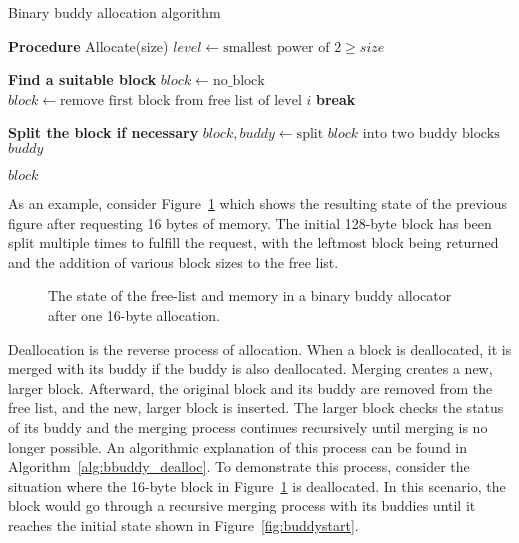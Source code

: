 \begin{algorithm}[h]
    \caption{Binary buddy allocation algorithm}
    \label{alg:bbuddy_alloc}
    \begin{algorithmic}[1]
        \Statex \textbf{Procedure} Allocate(size)
        \State $level \gets \text{smallest power of 2} \geq size$

        \Statex \textbf{Find a suitable block}
        \State $block \gets \text{no\_block}$
        \State $block \gets \text{remove first block from free list of level } i$
        \State \textbf{break}
        \EndIf
        \EndFor

        \State \Return {}
        \EndIf

        \Statex \textbf{Split the block if necessary}
        \State $block, buddy \gets \text{split } block \text{ into two buddy blocks}$
        \State {} $buddy$ 
        \EndWhile

        \State \Return $block$
    \end{algorithmic}
\end{algorithm}

As an example, consider Figure~\ref{fig:buddysplit} which shows the resulting state of the previous figure after requesting 16 bytes of memory. The initial 128-byte block has been split multiple times to fulfill the request, with the leftmost block being returned and the addition of various block sizes to the free list.

\begin{figure}[h]
    \centering
    
    \caption{The state of the free-list and memory in a binary buddy allocator after one 16-byte allocation.}
    \label{fig:buddysplit}
\end{figure}

\newpage
Deallocation is the reverse process of allocation. When a block is deallocated, it is merged with its buddy if the buddy is also deallocated. Merging creates a new, larger block. Afterward, the original block and its buddy are removed from the free list, and the new, larger block is inserted. The larger block checks the status of its buddy and the merging process continues recursively until merging is no longer possible. An algorithmic explanation of this process can be found in Algorithm~\ref{alg:bbuddy_dealloc}. To demonstrate this process, consider the situation where the 16-byte block in Figure~\ref{fig:buddysplit} is deallocated. In this scenario, the block would go through a recursive merging process with its buddies until it reaches the initial state shown in Figure~\ref{fig:buddystart}.

